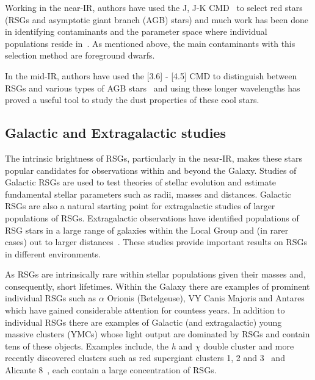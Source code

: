 Working in the near-IR, authors have used the J, J-K CMD~\citep[e.g.][]{2000ApJ...542..804N,2006A&A...452..195C,Neugent12} to select red stars (RSGs and asymptotic giant branch (AGB) stars) and much work has been done in identifying contaminants and the parameter space where individual populations reside in~\citep{2006A&A...452..195C}.
As mentioned above, the main contaminants with this selection method are foreground dwarfs.

In the mid-IR, authors have used the [3.6] - [4.5] CMD to distinguish between RSGs and various types of AGB stars~\citep{2006AJ....132.2034B,2014A&A...562A..75B,2015A&A...584A..33B,2015ApJ...800...51B,2015A&A...578A.100W} and using these longer wavelengths has proved a useful tool to study the dust properties of these cool stars.



\subsection{Galactic and Extragalactic studies} %
\label{sub:galactic_and_extragalactic}

The intrinsic brightness of RSGs, particularly in the near-IR, makes these stars popular candidates for observations within and beyond the Galaxy.
Studies of Galactic RSGs are used to test theories of stellar evolution and estimate fundamental stellar parameters such as radii, masses and distances.
Galactic RSGs are also a natural starting point for extragalactic studies of larger populations of RSGs.
Extragalactic observations have identified populations of RSG stars in a large range of galaxies within the Local Group and (in rarer cases) out to larger distances~\citep[e.g.][]{Elias85,Humphreys86, Massey06, 2007AJ....134.2474M, Groenewegen09,Massey13}. %
These studies provide important results on RSGs in different environments.


As RSGs are intrinsically rare within stellar populations given their masses and, consequently, short lifetimes.
Within the Galaxy there are examples of prominent individual RSGs such as $\alpha$ Orionis (Betelgeuse), VY Canis Majoris and Antares which have gained considerable attention for countess years\footnotemark.
In addition to individual RSGs there are examples of Galactic (and extragalactic) young massive clusters (YMCs) whose light output are dominated by RSGs and contain tens of these objects.
Examples include, the {\it h} and $\chi$ double cluster and more recently discovered clusters such as  red supergiant clusters 1, 2 and 3~\citep[RSGC01, RSGC02, RSGC03][respectively]{2006ApJ...643.1166F,2007ApJ...671..781D,2009A&A...498..109C} and Alicante 8~\citep{2010A&A...513A..74N}, each contain a large concentration of RSGs.

